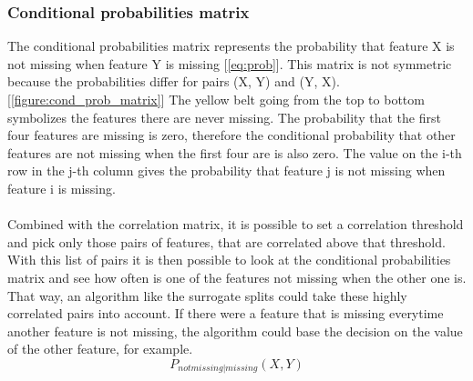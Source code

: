 \documentclass[11pt]{article}
\begin{document}
      \subsubsection{Conditional probabilities matrix}
        The conditional probabilities matrix represents the probability that feature X is not missing when feature Y is missing [\ref{eq:prob}]. This matrix is not symmetric because the probabilities differ for pairs (X, Y) and (Y, X). [\ref{figure:cond_prob_matrix}] The yellow belt going from the top to bottom symbolizes the features there are never missing.  The probability that the first four features are missing is zero, therefore the conditional probability that other features are not missing when the first four are is also zero. The value on the i-th row in the j-th column gives the probability that feature j is not missing when feature i is missing.
        \\~\\
        Combined with the correlation matrix, it is possible to set a correlation threshold and pick only those pairs of features, that are correlated above that threshold. With this list of pairs it is then possible to look at the conditional probabilities matrix and see how often is one of the features not missing when the other one is. That way, an algorithm like the surrogate splits \cite{splits} could take these highly correlated pairs into account. If there were a feature that is missing everytime another feature is not missing, the algorithm could base the decision on the value of the other feature, for example.
        \begin{equation}
          \label{eq:prob}
          P_{not missing | missing}(X, Y)
        \end{equation}
\end{document}
